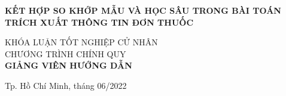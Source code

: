 \begin{titlepage}
\begin{center}
    { \Large \bfseries KẾT HỢP SO KHỚP MẪU VÀ HỌC SÂU TRONG BÀI TOÁN TRÍCH XUẤT THÔNG TIN ĐƠN THUỐC\\[3cm]} 


    \large KHÓA LUẬN TỐT NGHIỆP CỬ NHÂN\\
    \large CHƯƠNG TRÌNH CHÍNH QUY\\[2cm]

    \textbf{GIẢNG VIÊN HƯỚNG DẪN}\\
    \tenGVHD


    \vfill
    Tp. Hồ Chí Minh, tháng 06/2022

    \end{center}

\end{titlepage}